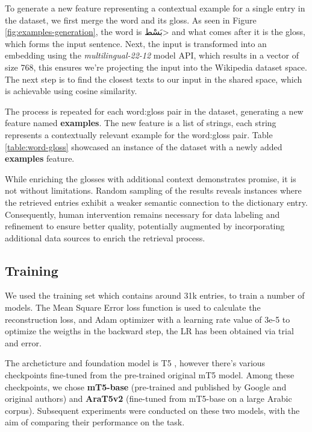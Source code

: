 \documentclass[12pt]{article}
\begin{document}
To generate a new feature representing a contextual example for a single entry in the dataset, we first merge the word and its gloss. As seen in Figure \ref{fig:examples-generation}, the word is \<بَسْط> and what comes after it is the gloss, which forms the input sentence. Next, the input is transformed into an embedding using the \textit{multilingual-22-12} model API, which results in a vector of size 768, this ensures we’re projecting the input into the Wikipedia dataset space. The next step is to find the closest texts to our input in the shared space, which is achievable using cosine similarity.

The process is repeated for each word:gloss pair in the dataset, generating a new feature named \textbf{examples}. The new feature is a list of strings, each string represents a contextually relevant example for the word:gloss pair. Table \ref{table:word-gloss} showcased an instance of the dataset with a newly added \textbf{examples} feature.

While enriching the glosses with additional context demonstrates promise, it is not without limitations. Random sampling of the results reveals instances where the retrieved entries exhibit a weaker semantic connection to the dictionary entry. Consequently, human intervention remains necessary for data labeling and refinement to ensure better quality, potentially augmented by incorporating additional data sources to enrich the retrieval process.

\subsection{Training}

% 

We used the training set which contains around 31k entries, to train a number of models. The Mean Square Error loss function is used to calculate the reconstruction loss, and Adam optimizer with a learning rate value of 3e-5 to optimize the weigths in the backward step, the LR has been obtained via trial and error. 

The archeticture and foundation model is T5 \cite{Linting2021}, however there's various checkpoints fine-tuned from the pre-trained original mT5 model. Among these checkpoints, we chose \textbf{mT5-base} (pre-trained and published by Google and original authors) and \textbf{AraT5v2} \cite{Nagoudi2021} (fine-tuned from mT5-base on a large Arabic corpus). Subsequent experiments were conducted on these two models, with the aim of comparing their performance on the task.
\end{document}

